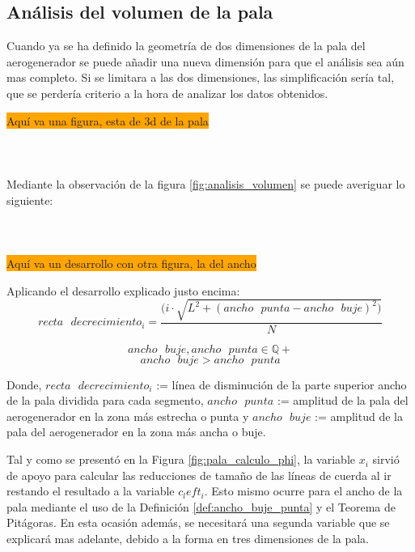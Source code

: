 \subsection{Análisis del volumen de la pala}
\label{section:volumen_pala}

Cuando ya se ha definido la geometría de dos dimensiones de la pala del aerogenerador se puede añadir una nueva dimensión para que el análisis sea aún mas completo. Si se limitara a las dos dimensiones, las simplificación sería tal, que se perdería criterio a la hora de analizar los datos obtenidos.

\colorbox{Orange}{ \Huge Aquí va una figura, esta de 3d de la pala} \\\\\\\\

Mediante la observación de la figura \ref{fig:analisis_volumen} se puede averiguar lo siguiente: \\\\\\\\

\colorbox{Orange}{ \Huge Aquí va un desarrollo con otra figura, la del ancho}

\begin{definicion}
Aplicando el desarrollo explicado justo encima:
$$ recta \text{ } decrecimiento_i = \dfrac{( i \cdot \sqrt{L^2 + (ancho \text{ } punta - ancho \text{ } buje)^2)}}{N}$$
 
$$ancho \text{ } buje, ancho  \text{ } punta \in \mathbb{Q+}$$
$$ ancho \text{ } buje > ancho \text{ } punta $$

Donde,
\centering $recta \text{ } decrecimiento_i $ := línea de disminución de la parte superior ancho de la pala dividida para cada segmento,  $ancho \text{ } punta$ := amplitud de la pala del aerogenerador en la zona más estrecha o punta y $ancho \text{ } buje$ := amplitud de la pala del aerogenerador en la zona más ancha o buje.
\label{def:ancho_buje_punta}
\end{definicion}


Tal y como se presentó en la Figura \ref{fig:pala_calculo_phi}, la variable $x_i$ sirvió de apoyo para calcular las reducciones de tamaño de las líneas de cuerda al ir restando el resultado a la variable $c_left_{i}$. Esto mismo ocurre para el ancho de la pala mediante el uso de la Definición \ref{def:ancho_buje_punta} y el Teorema de Pitágoras. En esta ocasión además, se necesitará una segunda variable que se explicará mas adelante, debido a la forma en tres dimensiones de la pala. 



